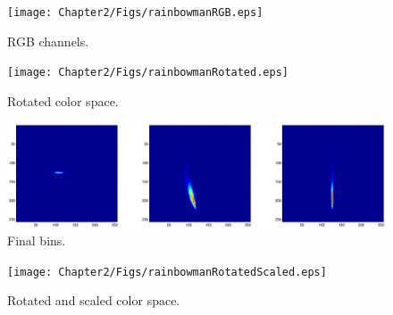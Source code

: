 \begin{figure}[h!]
  \centering
    \texttt{[image: Chapter2/Figs/rainbowmanRGB.eps]}
    \caption{RGB channels.}
\end{figure}

\begin{figure}[h!]
  \centering
    \texttt{[image: Chapter2/Figs/rainbowmanRotated.eps]}
    \caption{Rotated color space.}
\end{figure}

\begin{figure}[h!]
  \centering
    \includegraphics[width=\textwidth]{Chapter2/Figs/binsFinal2.eps}
    \caption{Final bins.}
\end{figure}

\begin{figure}[h!]
  \centering
    \texttt{[image: Chapter2/Figs/rainbowmanRotatedScaled.eps]}
    \caption{Rotated and scaled color space.}
\end{figure}







